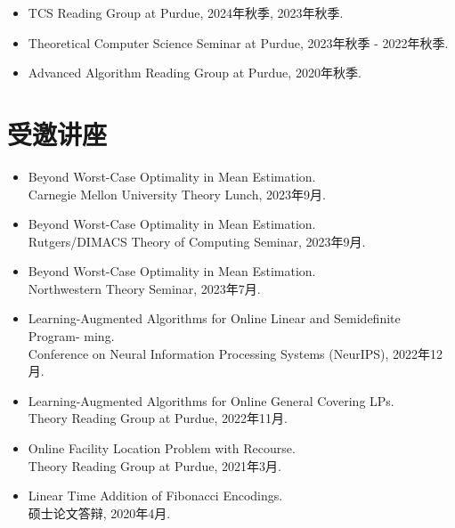 \documentclass[margin, 10pt]{res} %
\begin{document}
\begin{resume}
\begin{itemize}
\item TCS Reading Group at Purdue, 2024年秋季, 2023年秋季.
\item Theoretical Computer Science Seminar at Purdue, 2023年秋季 - 2022年秋季.
\item Advanced Algorithm Reading Group at Purdue, 2020年秋季.
\end{itemize}

\section{受邀讲座}
\begin{itemize}
\item Beyond Worst-Case Optimality in Mean Estimation.\\
Carnegie Mellon University Theory Lunch, 2023年9月.
\item Beyond Worst-Case Optimality in Mean Estimation.\\
Rutgers/DIMACS Theory of Computing Seminar, 2023年9月.
\item Beyond Worst-Case Optimality in Mean Estimation.\\
Northwestern Theory Seminar, 2023年7月.
\item Learning-Augmented Algorithms for Online Linear and Semidefinite Program-
ming.\\
Conference on Neural Information Processing Systems (NeurIPS), 2022年12月.
\item Learning-Augmented Algorithms for Online General Covering LPs.\\
Theory Reading Group at Purdue, 2022年11月.
\item Online Facility Location Problem with Recourse.\\
Theory Reading Group at Purdue, 2021年3月.
\item Linear Time Addition of Fibonacci Encodings.\\
硕士论文答辩, 2020年4月.
\end{itemize}


\end{resume}
\end{document}
